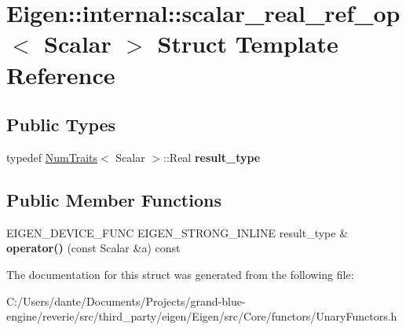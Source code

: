\hypertarget{struct_eigen_1_1internal_1_1scalar__real__ref__op}{}\section{Eigen\+::internal\+::scalar\+\_\+real\+\_\+ref\+\_\+op$<$ Scalar $>$ Struct Template Reference}
\label{struct_eigen_1_1internal_1_1scalar__real__ref__op}
\subsection*{Public Types}
\begin{DoxyCompactItemize}
\item 
\mbox{\label{struct_eigen_1_1internal_1_1scalar__real__ref__op_af8a46398acb2b10bf00fc8271bc11a99}} 
typedef \mbox{\hyperlink{struct_eigen_1_1_num_traits}{Num\+Traits}}$<$ Scalar $>$\+::Real {\bfseries result\+\_\+type}
\end{DoxyCompactItemize}
\subsection*{Public Member Functions}
\begin{DoxyCompactItemize}
\item 
\mbox{\label{struct_eigen_1_1internal_1_1scalar__real__ref__op_ac0d636aef5893c9eab424fccbbbc1d6e}} 
E\+I\+G\+E\+N\+\_\+\+D\+E\+V\+I\+C\+E\+\_\+\+F\+U\+NC E\+I\+G\+E\+N\+\_\+\+S\+T\+R\+O\+N\+G\+\_\+\+I\+N\+L\+I\+NE result\+\_\+type \& {\bfseries operator()} (const Scalar \&a) const
\end{DoxyCompactItemize}


The documentation for this struct was generated from the following file\+:\begin{DoxyCompactItemize}
\item 
C\+:/\+Users/dante/\+Documents/\+Projects/grand-\/blue-\/engine/reverie/src/third\+\_\+party/eigen/\+Eigen/src/\+Core/functors/Unary\+Functors.\+h\end{DoxyCompactItemize}
